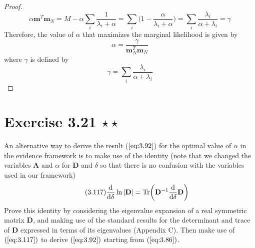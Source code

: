 \begin{proof}
    \[
        \alpha \mathbf{m}^T\mathbf{m}_N 
        = M - \alpha \sum_i \frac{1}{\lambda_i + \alpha}
        = \sum_i \bigg(1 - \frac{\alpha}{\lambda_i + \alpha}\bigg)
        = \sum_i \frac{\lambda_i}{\alpha + \lambda_i}
        = \gamma
    \] 
    Therefore, the value of $\alpha$ that maximizes the marginal likelihood
    is given by 
    \begin{equation}\label{eq:3.92}\tag{3.92}
        \alpha = \frac{\gamma}{\mathbf{m}_N^T\mathbf{m}_N}
    \end{equation}
    where $\gamma$ is defined by
    \begin{equation}\label{eq:3.91}\tag{3.91}
        \gamma = \sum_i \frac{\lambda_i}{\alpha + \lambda_i}
    \end{equation}
\end{proof}

\section*{Exercise 3.21 $\star \star$}
An alternative way to derive the result ($\ref{eq:3.92}$) for the optimal
value of $\alpha$ in the evidence framework is to make use of the identity
(note that we changed the variables $\mathbf{A}$ and $\alpha$ for $\mathbf{D}$ and
$\delta$ so that there is no confusion with the variables used in our 
framework)
\begin{equation}\label{eq:3.117}\tag{3.117}
    \dv{\delta} \ln |\mathbf{D}| = \text{Tr}\bigg(\mathbf{D}^{-1}\dv{\delta}\mathbf{D}\bigg)
\end{equation}
Prove this identity by considering the eigenvalue expansion of a real
symmetric matrix $\mathbf{D}$, and making use of the standard results
for the determinant and trace of $\mathbf{D}$ expressed in terms of 
its eigenvalues (Appendix C). Then make use of $(\ref{eq:3.117})$ to
derive $(\ref{eq:3.92})$ starting from $(\ref{eq:3.86})$.

\vspace{1em}


